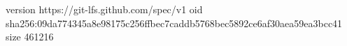 version https://git-lfs.github.com/spec/v1
oid sha256:09da774345a8e98175c256ffbec7caddb5768bec5892ce6af30aea59ea3bcc41
size 461216
